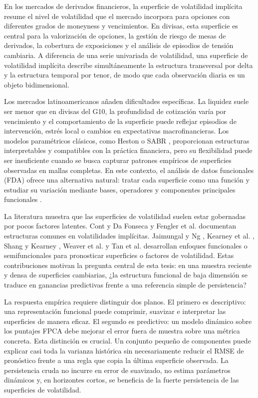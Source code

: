 \documentclass[12pt,a4paper]{article}
\newcommand{\SVI}{superficie de volatilidad implícita}
\begin{document}
En los mercados de derivados financieros, la \SVI{} resume el nivel de volatilidad que el mercado incorpora para opciones con diferentes grados de moneyness y vencimientos. En divisas, esta superficie es central para la valorización de opciones, la gestión de riesgo de mesas de derivados, la cobertura de exposiciones y el análisis de episodios de tensión cambiaria. A diferencia de una serie univariada de volatilidad, una \SVI{} describe simultáneamente la estructura transversal por delta y la estructura temporal por tenor, de modo que cada observación diaria es un objeto bidimensional.

Los mercados latinoamericanos añaden dificultades específicas. La liquidez suele ser menor que en divisas del G10, la profundidad de cotización varía por vencimiento y el comportamiento de la superficie puede reflejar episodios de intervención, estrés local o cambios en expectativas macrofinancieras. Los modelos paramétricos clásicos, como Heston \cite{Heston1993} o SABR \cite{Hagan2002}, proporcionan estructuras interpretables y compatibles con la práctica financiera, pero su flexibilidad puede ser insuficiente cuando se busca capturar patrones empíricos de superficies observadas en mallas completas. En este contexto, el análisis de datos funcionales (FDA) ofrece una alternativa natural: tratar cada superficie como una función y estudiar su variación mediante bases, operadores y componentes principales funcionales \cite{RamsaySilverman2006}.

La literatura muestra que las superficies de volatilidad suelen estar gobernadas por pocos factores latentes. Cont y Da Fonseca \cite{ContDaFonseca2002} y Fengler et al. \cite{Fengler2003} documentan estructuras comunes en volatilidades implícitas. Jaimungal y Ng \cite{JaimungalNg2007}, Kearney et al. \cite{Kearney2018}, Shang y Kearney \cite{ShangKearney2022}, Weaver et al. \cite{Weaver2020} y Tan et al. \cite{Tan2024} desarrollan enfoques funcionales o semifuncionales para pronosticar superficies o factores de volatilidad. Estas contribuciones motivan la pregunta central de esta tesis: en una muestra reciente y densa de superficies cambiarias, ¿la estructura funcional de baja dimensión se traduce en ganancias predictivas frente a una referencia simple de persistencia?

La respuesta empírica requiere distinguir dos planos. El primero es descriptivo: una representación funcional puede comprimir, suavizar e interpretar las superficies de manera eficaz. El segundo es predictivo: un modelo dinámico sobre los puntajes FPCA debe mejorar el error fuera de muestra sobre una métrica concreta. Esta distinción es crucial. Un conjunto pequeño de componentes puede explicar casi toda la varianza histórica sin necesariamente reducir el RMSE de pronóstico frente a una regla que copia la última superficie observada. La persistencia cruda no incurre en error de suavizado, no estima parámetros dinámicos y, en horizontes cortos, se beneficia de la fuerte persistencia de las superficies de volatilidad.
\end{document}
